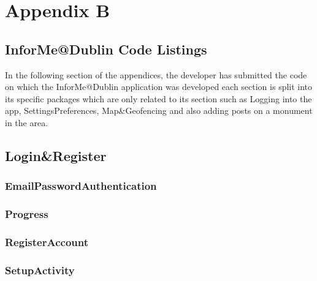 \chapter{Appendix B}

\section{InforMe@Dublin Code Listings}
In the following section of the appendices, the developer has submitted the code on which the InforMe@Dublin application was developed each section is split into its specific packages which are only related to its section such as Logging into the app, SettingsPreferences, Map\&Geofencing and also adding posts on a monument in the area. 

\section{Login\&Register}

\subsection{EmailPasswordAuthentication}



\subsection{Progress}



\subsection{RegisterAccount}



\subsection{SetupActivity}



